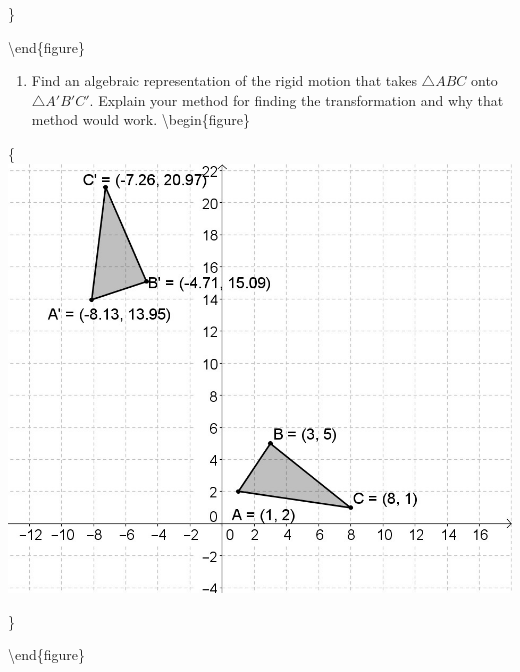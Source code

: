 \documentclass[
]{book}
\providecommand{\tightlist}{%
  \setlength{\itemsep}{0pt}\setlength{\parskip}{0pt}}
\theoremstyle{definition}
\theoremstyle{definition}
\theoremstyle{definition}
\theoremstyle{definition}
\theoremstyle{remark}
\begin{document}
\}

\textbackslash end\{figure\}

\begin{enumerate}
\def\labelenumi{\arabic{enumi}.}
\tightlist
\item
  Find an algebraic representation of the rigid motion that takes \(\triangle ABC\) onto \(\triangle A'B'C'\). Explain your method for finding the transformation and why that method would work.
  \textbackslash begin\{figure\}
\end{enumerate}

\{\centering \includegraphics[width=0.35\linewidth]{images/Transformation_Triangles}

\}

\textbackslash end\{figure\}
\end{document}
